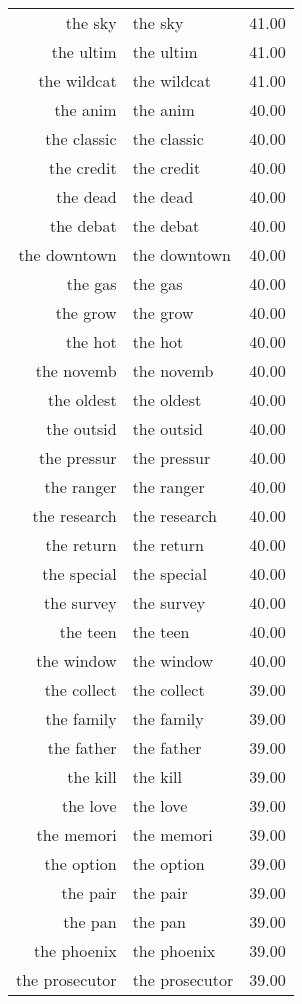 \begin{table}[ht]
\begin{tabular}{rlr}
  the sky & the sky & 41.00 \\ 
  the ultim & the ultim & 41.00 \\ 
  the wildcat & the wildcat & 41.00 \\ 
  the anim & the anim & 40.00 \\ 
  the classic & the classic & 40.00 \\ 
  the credit & the credit & 40.00 \\ 
  the dead & the dead & 40.00 \\ 
  the debat & the debat & 40.00 \\ 
  the downtown & the downtown & 40.00 \\ 
  the gas & the gas & 40.00 \\ 
  the grow & the grow & 40.00 \\ 
  the hot & the hot & 40.00 \\ 
  the novemb & the novemb & 40.00 \\ 
  the oldest & the oldest & 40.00 \\ 
  the outsid & the outsid & 40.00 \\ 
  the pressur & the pressur & 40.00 \\ 
  the ranger & the ranger & 40.00 \\ 
  the research & the research & 40.00 \\ 
  the return & the return & 40.00 \\ 
  the special & the special & 40.00 \\ 
  the survey & the survey & 40.00 \\ 
  the teen & the teen & 40.00 \\ 
  the window & the window & 40.00 \\ 
  the collect & the collect & 39.00 \\ 
  the family & the family & 39.00 \\ 
  the father & the father & 39.00 \\ 
  the kill & the kill & 39.00 \\ 
  the love & the love & 39.00 \\ 
  the memori & the memori & 39.00 \\ 
  the option & the option & 39.00 \\ 
  the pair & the pair & 39.00 \\ 
  the pan & the pan & 39.00 \\ 
  the phoenix & the phoenix & 39.00 \\ 
  the prosecutor & the prosecutor & 39.00 \\ 

\end{tabular}
\end{table}
